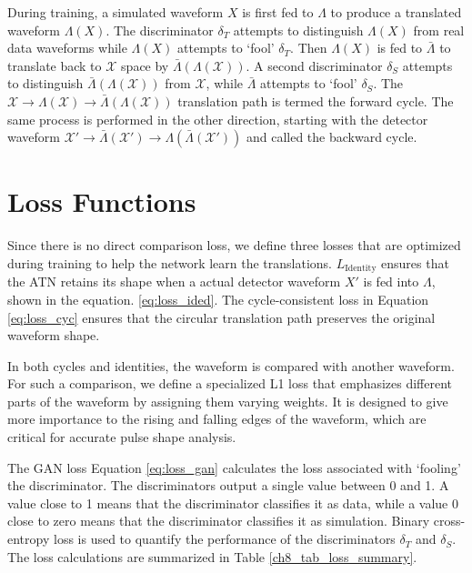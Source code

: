 During training, a simulated waveform $X$ is first fed to $\Lambda$ to produce a translated waveform $\Lambda(X)$. The discriminator $\delta_{T}$ attempts to distinguish $\Lambda(X)$ from real data waveforms while $\Lambda(X)$ attempts to `fool' $\delta_{T}$. Then $\Lambda(X)$ is fed to $\bar{\Lambda}$ to translate back to $\mathcal{X}$ space by $\bar{\Lambda}(\Lambda(\mathcal{X}))$. A second discriminator $\delta_{S}$ attempts to distinguish $\bar{\Lambda}(\Lambda(\mathcal{X}))$ from $\mathcal{X}$, while $\bar{\Lambda}$ attempts to `fool' $\delta_{S}$. The $\mathcal{X}\rightarrow{}\Lambda(\mathcal{X})\rightarrow{}\bar{\Lambda}(\Lambda(\mathcal{X}))$ translation path is termed the forward cycle. The same process is performed in the other direction, starting with the detector waveform $\mathcal{X}'\rightarrow{}\bar{\Lambda}(\mathcal{X}')\rightarrow{}\Lambda(\bar{\Lambda}(\mathcal{X}'))$ and called the backward cycle.

\section{Loss Functions}

Since there is no direct comparison loss, we define three losses that are optimized during training to help the network learn the translations. $L_{\mathrm{Identity}}$ ensures that the ATN retains its shape when a actual detector waveform $X'$ is fed into $\Lambda$, shown in the equation. \ref{eq:loss_ided}. The cycle-consistent loss in Equation \ref{eq:loss_cyc} ensures that the circular translation path preserves the original waveform shape. 

In both cycles and identities, the waveform is compared with another waveform. For such a comparison, we define a specialized L1 loss that emphasizes different parts of the waveform by assigning them varying weights. It is designed to give more importance to the rising and falling edges of the waveform, which are critical for accurate pulse shape analysis.


The GAN loss Equation \ref{eq:loss_gan} calculates the loss associated with `fooling' the discriminator.  The discriminators output a single value between 0 and 1. A value close to 1 means that the discriminator classifies it as data, while a value 0 close to zero means that the discriminator classifies it as simulation. Binary cross-entropy loss is used to quantify the performance of the discriminators $\delta_{T}$ and $\delta_{S}$. The loss calculations are summarized in Table \ref{ch8_tab_loss_summary}.

